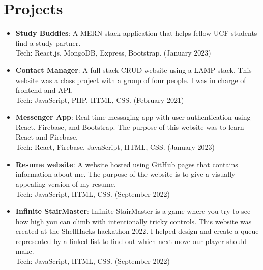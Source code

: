 \documentclass[a4paper,20pt]{article}
\newcommand{\resumeItem}[2]{
  \item\normalsize{
    \textbf{#1}{: #2 \vspace{1pt}}
  }
}
\newcommand{\resumeSubItem}[2]{\resumeItem{#1}{#2}\vspace{1pt}}
\newcommand{\resumeSubHeadingListStart}{\begin{itemize}[leftmargin=*]}
\newcommand{\resumeSubHeadingListEnd}{\end{itemize}}
\begin{document}
    \section{Projects}
        \resumeSubHeadingListStart
            \resumeSubItem{Study Buddies}{ A MERN stack application that helps fellow UCF students find a study partner.
            \\Tech: React.js, MongoDB, Express, Bootstrap. (January 2023)}
            \resumeSubItem{Contact Manager}{ A full stack CRUD website using a LAMP stack. This website was a class project with a group of four people. I was in charge of frontend and API.
            \\Tech: JavaScript, PHP, HTML, CSS. (February 2021)}
            \resumeSubItem{Messenger App}{Real-time messaging app with user authentication using React, Firebase, and Bootstrap. The purpose of this website was to learn React and Firebase.
            \\Tech: React, Firebase, JavaScript, HTML, CSS. (January 2023)}
            \resumeSubItem{Resume website}{A website hosted using GitHub pages that contains information about me. The purpose of the website is to give a visually appealing version of my resume.\\Tech: JavaScript, HTML, CSS. (September 2022)}
            \resumeSubItem{Infinite StairMaster}{Infinite StairMaster is a game where you try to see how high you can climb with intentionally tricky controls. This website was created at the ShellHacks hackathon 2022. I helped design and create a queue represented by a linked list to find out which next move our player should make. \\Tech: JavaScript, HTML, CSS. (September 2022)}
            \vspace{2pt}
        \resumeSubHeadingListEnd


\end{document}

